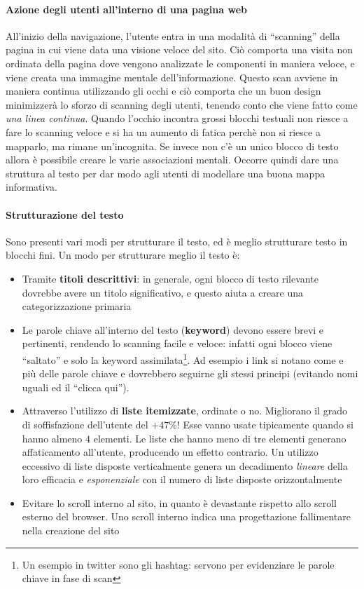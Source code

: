 \paragraph*{Azione degli utenti all'interno di una pagina web} All'inizio della navigazione, l'utente entra in una modalit\`a di ``scanning'' della pagina in cui viene data una visione veloce del sito. Ci\`o comporta una visita non ordinata della pagina dove vengono analizzate le componenti in maniera veloce, e viene creata una immagine mentale dell'informazione. Questo scan avviene in maniera continua utilizzando gli occhi e ci\`o comporta che un buon design minimizzer\`a lo sforzo di scanning degli utenti, tenendo conto che viene fatto come \textit{una linea continua}.
Quando l'occhio incontra grossi blocchi testuali non riesce a fare lo scanning veloce e si ha un aumento di fatica perch\`e non si riesce a mapparlo, ma rimane un'incognita. Se invece non c'\`e un unico blocco di testo allora \`e possibile creare le varie associazioni mentali. Occorre quindi dare una struttura al testo per dar modo agli utenti di modellare una buona mappa informativa.

\paragraph{Strutturazione del testo} Sono presenti vari modi per strutturare il testo, ed \`e meglio strutturare testo in blocchi fini. Un modo per strutturare meglio il testo \`e:
\begin{itemize}

\item Tramite \textbf{titoli descrittivi}: in generale, ogni blocco di testo rilevante dovrebbe avere un titolo significativo, e questo aiuta a creare una categorizzazione primaria
\item Le parole chiave all'interno del testo (\textbf{keyword}) devono essere brevi e pertinenti, rendendo lo scanning facile e veloce: infatti ogni blocco viene ``saltato'' e solo la keyword assimilata\footnote{Un esempio in twitter sono gli hashtag: servono per evidenziare le parole chiave in fase di scan}. Ad esempio i link si notano come e pi\`u delle parole chiave e dovrebbero seguirne gli stessi principi (evitando nomi uguali ed il ``clicca qui'').

\item Attraverso l'utilizzo di \textbf{liste itemizzate}, ordinate o no. Migliorano il grado di soffisfazione dell'utente del $+47\%$! Esse vanno usate tipicamente quando si hanno almeno $4$ elementi. Le liste che hanno meno di tre elementi generano affaticamento all'utente, producendo un effetto contrario. Un utilizzo eccessivo di liste disposte verticalmente genera un decadimento \textit{lineare} della loro efficacia e \textit{esponenziale} con il numero di liste disposte orizzontalmente

\item Evitare lo scroll interno al sito, in quanto \`e devastante rispetto allo scroll esterno del browser. Uno scroll interno indica una progettazione fallimentare nella creazione del sito

\end{itemize}

